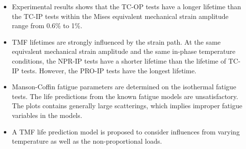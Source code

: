 \begin{itemize}
\item Experimental results shows that the TC-OP tests have a longer lifetime than the TC-IP tests within the Mises equivalent mechanical strain amplitude range from 0.6\% to 1\%.

\item TMF lifetimes are strongly influenced by the strain path. At the same equivalent mechanical strain amplitude and the same in-phase temperature conditions, the NPR-IP tests have a shorter lifetime than the lifetime of TC-IP tests. However, the PRO-IP tests have the longest lifetime.

\item Manson-Coffin fatigue parameters are determined on the isothermal fatigue tests. The life predictions from the known fatigue models are unsatisfactory. The plots contains generally large scatterings, which implies improper fatigue variables in the models.

\item A TMF life prediction model is proposed to consider influences from varying temperature as well as the non-proportional loads.
\end{itemize}
